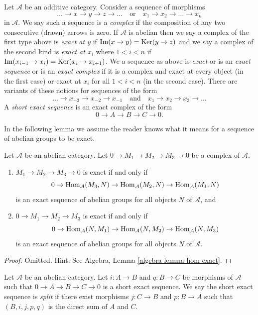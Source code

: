 \begin{definition}
\label{definition-exact}
Let $\mathcal{A}$ be an additive category.
Consider a sequence of morphisms
$$
\ldots \to x \to y \to z \to \ldots
\quad\text{or}\quad
x_1 \to x_2 \to \ldots \to x_n
$$
in $\mathcal{A}$. We say such a sequence is a
{\it complex} if the
composition of any two consecutive (drawn)
arrows is zero.
If $\mathcal{A}$ is abelian then we say a
complex of the first
type above is {\it exact at $y$} if $\mathop{\mathrm{Im}}(x
\to y) = \mathop{\mathrm{Ker}}(y \to z)$
and we say a complex of the second kind is
{\it exact at $x_i$}
where $1 < i < n$ if
$\mathop{\mathrm{Im}}(x_{i - 1} \to x_i) = \mathop{\mathrm{Ker}}(x_i \to x_{i +
1})$. We a
sequence as above is {\it exact} or is an
{\it exact sequence} or is an
{\it exact complex} if it is a complex and
exact at every object (in
the first case) or exact at $x_i$ for all $1
< i < n$ (in the second case).
There are variants of these notions for
sequences of the form
$$
\ldots \to x_{-3} \to x_{-2} \to x_{-1}
\quad\text{and}\quad
x_1 \to x_2 \to x_3 \to \ldots
$$
A {\it short exact sequence} is an exact
complex of the form
$$
0 \to A  \to B \to C \to 0.
$$
\end{definition}

\noindent
In the following lemma we assume the reader
knows what it means
for a sequence of abelian groups to be exact.

\begin{lemma}
\label{lemma-check-exactness}
Let $\mathcal{A}$ be an abelian category.
Let $0 \to M_1 \to M_2 \to M_3 \to 0$ be a
complex of $\mathcal{A}$.
\begin{enumerate}
\item $M_1 \to M_2 \to M_3 \to 0$ is exact if
and only if
$$
0 \to \mathop{\mathrm{Hom}}\nolimits_\mathcal{A}(M_3, N) \to
\mathop{\mathrm{Hom}}\nolimits_\mathcal{A}(M_2, N) \to
\mathop{\mathrm{Hom}}\nolimits_\mathcal{A}(M_1, N)
$$
is an exact sequence of abelian groups for
all objects $N$ of
$\mathcal{A}$, and
\item $0 \to M_1 \to M_2 \to M_3$ is exact if
and only if
$$
0 \to \mathop{\mathrm{Hom}}\nolimits_\mathcal{A}(N, M_1) \to
\mathop{\mathrm{Hom}}\nolimits_\mathcal{A}(N, M_2) \to
\mathop{\mathrm{Hom}}\nolimits_\mathcal{A}(N, M_3)
$$
is an exact sequence of abelian groups for
all objects $N$ of $\mathcal{A}$.
\end{enumerate}
\end{lemma}

\begin{proof}
Omitted. Hint: See
Algebra, Lemma \ref{algebra-lemma-hom-exact}.
\end{proof}

\begin{definition}
\label{definition-ses-split}
Let $\mathcal{A}$ be an abelian category.
Let $i : A \to B$ and $q : B \to C$ be
morphisms
of $\mathcal{A}$ such that
$0 \to A \to B \to C \to 0$ is a short
exact sequence. We say the short exact
sequence is {\it split} if there exist
morphisms $j : C \to B$ and $p : B \to A$
such
that $(B, i, j, p, q)$ is the direct sum of
$A$ and $C$.
\end{definition}

